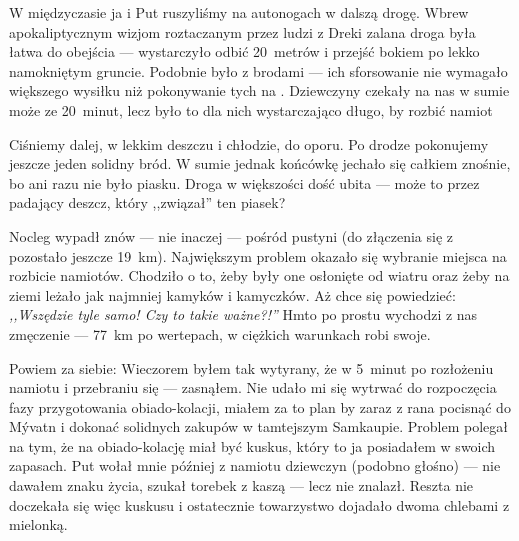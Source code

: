 
\pagebreak

W międzyczasie ja i Put ruszyliśmy na autonogach w dalszą drogę. Wbrew apokaliptycznym wizjom roztaczanym przez ludzi z Dreki zalana droga była łatwa do obejścia --- wystarczyło odbić 20~metrów i przejść bokiem po lekko namokniętym gruncie. Podobnie było z brodami --- ich sforsowanie nie wymagało większego wysiłku niż pokonywanie tych na . Dziewczyny czekały na nas w sumie może ze 20~minut, lecz było to dla nich wystarczająco długo, by rozbić namiot \tongue

Ciśniemy dalej, w lekkim deszczu i chłodzie, do oporu. Po drodze pokonujemy jeszcze jeden solidny bród. W sumie jednak końcówkę jechało się całkiem znośnie, bo ani razu nie było piasku. Droga w większości dość ubita --- może to przez padający deszcz, który ,,związał'' ten piasek?


Nocleg wypadł znów --- nie inaczej --- pośród pustyni (do złączenia się z  pozostało jeszcze 19~km). Największym problem okazało się wybranie miejsca na rozbicie namiotów. Chodziło o to, żeby były one osłonięte od wiatru oraz żeby na ziemi leżało jak najmniej kamyków i kamyczków. Aż chce się powiedzieć: \emph{,,Wszędzie tyle samo! Czy to takie ważne?!''} Hm\textellipsis to po prostu wychodzi z nas zmęczenie --- 77~km po wertepach, w ciężkich warunkach robi swoje.

Powiem za siebie: Wieczorem byłem tak wytyrany, że w 5~minut po rozłożeniu namiotu i przebraniu się --- zasnąłem. Nie udało mi się wytrwać do rozpoczęcia fazy przygotowania obiado-kolacji, miałem za to plan by zaraz z rana pocisnąć do Mývatn i dokonać solidnych zakupów w tamtejszym Samkaupie. Problem polegał na tym, że na obiado-kolację miał być kuskus, który to ja posiadałem w swoich zapasach. Put wołał mnie później z namiotu dziewczyn (podobno głośno) --- nie dawałem zna\-ku życia, szukał torebek z kaszą --- lecz nie znalazł. Reszta nie doczekała się więc kuskusu i ostatecznie towarzystwo dojadało dwoma chlebami z mielonką.
